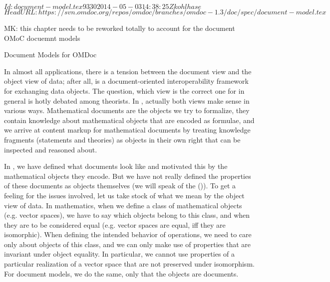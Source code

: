 \svnInfo $Id: document-model.tex 9330 2014-05-03 14:38:25Z kohlhase $
\svnKeyword $HeadURL: https://svn.omdoc.org/repos/omdoc/branches/omdoc-1.3/doc/spec/document-model.tex $

\begin{oldpart}{MK: this chapter needs to be reworked totally to account for the document
    OMoC docuemnt models}
\begin{tchapter}[id=document-model]{Document Models for OMDoc}

  In almost all {\xml} applications, there is a tension between the document view and the
  object view of data; after all, {\xml} is a document-oriented interoperability framework
  for exchanging data objects. The question, which view is the correct one for {\xml} in
  general is hotly debated among {\xml} theorists. In {\omdoc}, actually both views make
  sense in various ways. Mathematical documents are the objects we try to formalize, they
  contain knowledge about mathematical objects that are encoded as formulae, and we arrive
  at content markup for mathematical documents by treating knowledge fragments (statements
  and theories) as objects in their own right that can be inspected and reasoned about.

  In {}, we have defined what {\omdoc} documents look like and
  motivated this by the mathematical objects they encode. But we have not really defined
  the properties of these documents as objects themselves (we will speak of the {\omdoc}
  {} ({})). To get a feeling for the
  issues involved, let us take stock of what we mean by the object view of data. In
  mathematics, when we define a class of mathematical objects (e.g.  vector spaces), we
  have to say which objects belong to this class, and when they are to be considered equal
  (e.g.  vector spaces are equal, iff they are isomorphic). When defining the intended
  behavior of operations, we need to care only about objects of this class, and we can
  only make use of properties that are invariant under object equality. In particular, we
  cannot use properties of a particular realization of a vector space that are not
  preserved under isomorphism. For document models, we do the same, only that the objects
  are documents.



\end{tchapter}
\end{oldpart}

